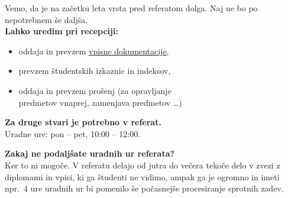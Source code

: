 \documentclass[a4paper,oneside,12pt]{article}
\title{\Title}
\author{\Author}
\date{\today}
\theoremstyle{definition}
\begin{document}
\thispagestyle{empty}  %

\fontsize{48}{48}\selectfont

Vemo, da je na začetku leta vrsta pred referatom dolga.
Naj ne bo po nepotrebnem še daljša. \\[12pt]

\fontsize{28}{28}\selectfont
\textbf{Lahko uredim pri recepciji:}
\fontsize{24}{24}\selectfont
\begin{itemize}
  \item oddaja in prevzem \href{http://www.fmf.uni-lj.si/si/obvestila/39071}{vpisne
    dokumentacije},
  \item prevzem študentskih izkaznic in indeksov,
  \item oddaja in prevzem prošenj (za opravljanje \\ predmetov vnaprej, zamenjava predmetov \dots)
\end{itemize}

\vspace{32pt}

\textbf{Za druge stvari je potrebno v referat.} \\[2ex]
Uradne ure: pon -- pet, 10:00 -- 12:00.

\vfill


\fontsize{18}{18}\selectfont
\textbf{Zakaj ne podaljšate uradnih ur referata?} \\[6pt]
Ker to ni mogoče. V referatu delajo od jutra do večera tekoče delo v zvezi z
diplomami in vpisi, ki ga študenti ne vidimo, ampak ga je ogromno in imeti npr.\
4 ure uradnih ur bi pomenilo še počasnejše procesiranje sprotnih zadev.
\end{document}
